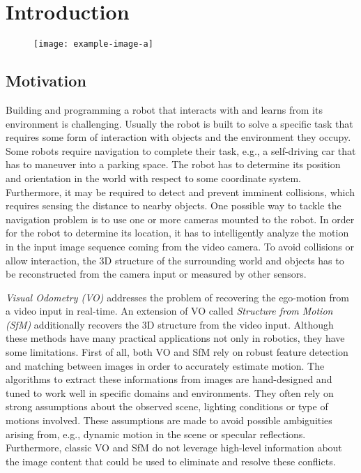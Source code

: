 \chapter{Introduction}
	
	
	
	
	\begin{figure}
		\centering
		\texttt{[image: example-image-a]}
		\caption{\label{fig:sfm-example}}
	\end{figure}
		
	\section{Motivation}
		
		Building and programming a robot that interacts with and learns from its environment is challenging.
		Usually the robot is built to solve a specific task that requires some form of interaction with objects and the environment they occupy.
		Some robots require navigation to complete their task, e.g., a self-driving car that has to maneuver into a parking space.
		The robot has to determine its position and orientation in the world with respect to some coordinate system.
		Furthermore, it may be required to detect and prevent imminent collisions, which requires sensing the distance to nearby objects.
		One possible way to tackle the navigation problem is to use one or more cameras mounted to the robot.
		In order for the robot to determine its location, it has to intelligently analyze the motion in the input image sequence coming from the video camera.
		To avoid collisions or allow interaction, the 3D structure of the surrounding world and objects has to be reconstructed from the camera input or measured by other sensors.
		
		\emph{Visual Odometry (VO)}  addresses the problem of recovering the ego-motion from a video input in real-time. 
		An extension of VO called \emph{Structure from Motion (SfM)}  additionally recovers the 3D structure from the video input.
		Although these methods have many practical applications not only in robotics, they have some limitations.
		First of all, both VO and SfM rely on robust feature detection and matching between images in order to accurately estimate motion.
		The algorithms to extract these informations from images are hand-designed and tuned to work well in specific domains and environments.
		They often rely on strong assumptions about the observed scene, lighting conditions or type of motions involved.
		These assumptions are made to avoid possible ambiguities arising from, e.g., dynamic motion in the scene or specular reflections.
		Furthermore, classic VO and SfM do not leverage high-level information about the image content that could be used to eliminate and resolve these conflicts.
		
